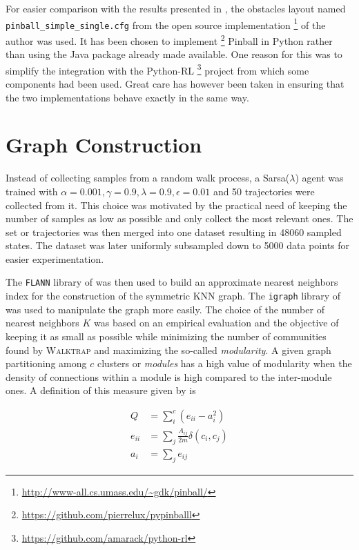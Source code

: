 For easier comparison with the results presented in \cite{Konidaris2009}, the obstacles layout named \texttt{pinball\_simple\_single.cfg} from the open source implementation \footnote{\url{http://www-all.cs.umass.edu/~gdk/pinball/}} of the author was used. It has been chosen to implement \footnote{\url{https://github.com/pierrelux/pypinballl}} Pinball in Python rather than using the Java package already made available. One reason for this was to simplify the integration with the Python-RL \footnote{\url{https://github.com/amarack/python-rl}} project from which some components had been used. Great care has however been taken in ensuring that the two implementations behave exactly in the same way. 

\section{Graph Construction}

Instead of collecting samples from a random walk process, a Sarsa($\lambda$) agent was trained with $\alpha = 0.001, \gamma = 0.9, \lambda = 0.9, \epsilon = 0.01$ and 50 trajectories were collected from it. This choice was motivated by the practical need of keeping the number of samples as low as possible and only collect the most relevant ones. The set or trajectories was then merged into one dataset resulting in 48060 sampled states. The dataset was  later uniformly subsampled down to 5000 data points for easier experimentation.

The \texttt{FLANN} library of \cite{Muja2009} was then used to build an approximate nearest neighbors index for the construction of the symmetric KNN graph. The \texttt{igraph} library of \cite{Csardi2006} was used to manipulate the graph more easily. The choice of the number of nearest neighbors $K$ was based on an empirical evaluation and the objective of keeping it as small as possible while minimizing the number of communities found by \textsc{Walktrap} and maximizing the so-called \textit{modularity}. A given graph partitioning among $c$ clusters or \textit{modules} has a high value of modularity when the density of connections within a module is high compared to the inter-module ones. A definition of this measure given by \cite{Newman2006} is

\begin{align}
Q &= \sum_{i}^c \left( e_{ii} - a_i^2 \right) \\
e_{ii} &= \sum_j 	\frac{A_{ij}}{2m} \delta(c_i, c_j) \\
a_i &= \sum_j e_{ij}
\end{align}

